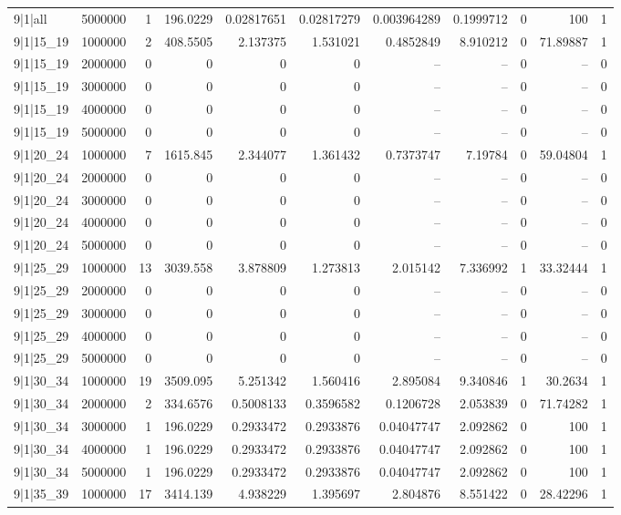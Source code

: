 \begin{tabular}{lrrrrrrrrrr}
9|1|all & 5000000 & 1 & 196.0229 & 0.02817651 & 0.02817279 & 0.003964289 & 0.1999712 & 0 & 100 & 1 \\
9|1|15\_19 & 1000000 & 2 & 408.5505 & 2.137375 & 1.531021 & 0.4852849 & 8.910212 & 0 & 71.89887 & 1 \\
9|1|15\_19 & 2000000 & 0 & 0 & 0 & 0 & -- & -- & 0 & -- & 0 \\
9|1|15\_19 & 3000000 & 0 & 0 & 0 & 0 & -- & -- & 0 & -- & 0 \\
9|1|15\_19 & 4000000 & 0 & 0 & 0 & 0 & -- & -- & 0 & -- & 0 \\
9|1|15\_19 & 5000000 & 0 & 0 & 0 & 0 & -- & -- & 0 & -- & 0 \\
9|1|20\_24 & 1000000 & 7 & 1615.845 & 2.344077 & 1.361432 & 0.7373747 & 7.19784 & 0 & 59.04804 & 1 \\
9|1|20\_24 & 2000000 & 0 & 0 & 0 & 0 & -- & -- & 0 & -- & 0 \\
9|1|20\_24 & 3000000 & 0 & 0 & 0 & 0 & -- & -- & 0 & -- & 0 \\
9|1|20\_24 & 4000000 & 0 & 0 & 0 & 0 & -- & -- & 0 & -- & 0 \\
9|1|20\_24 & 5000000 & 0 & 0 & 0 & 0 & -- & -- & 0 & -- & 0 \\
9|1|25\_29 & 1000000 & 13 & 3039.558 & 3.878809 & 1.273813 & 2.015142 & 7.336992 & 1 & 33.32444 & 1 \\
9|1|25\_29 & 2000000 & 0 & 0 & 0 & 0 & -- & -- & 0 & -- & 0 \\
9|1|25\_29 & 3000000 & 0 & 0 & 0 & 0 & -- & -- & 0 & -- & 0 \\
9|1|25\_29 & 4000000 & 0 & 0 & 0 & 0 & -- & -- & 0 & -- & 0 \\
9|1|25\_29 & 5000000 & 0 & 0 & 0 & 0 & -- & -- & 0 & -- & 0 \\
9|1|30\_34 & 1000000 & 19 & 3509.095 & 5.251342 & 1.560416 & 2.895084 & 9.340846 & 1 & 30.2634 & 1 \\
9|1|30\_34 & 2000000 & 2 & 334.6576 & 0.5008133 & 0.3596582 & 0.1206728 & 2.053839 & 0 & 71.74282 & 1 \\
9|1|30\_34 & 3000000 & 1 & 196.0229 & 0.2933472 & 0.2933876 & 0.04047747 & 2.092862 & 0 & 100 & 1 \\
9|1|30\_34 & 4000000 & 1 & 196.0229 & 0.2933472 & 0.2933876 & 0.04047747 & 2.092862 & 0 & 100 & 1 \\
9|1|30\_34 & 5000000 & 1 & 196.0229 & 0.2933472 & 0.2933876 & 0.04047747 & 2.092862 & 0 & 100 & 1 \\
9|1|35\_39 & 1000000 & 17 & 3414.139 & 4.938229 & 1.395697 & 2.804876 & 8.551422 & 0 & 28.42296 & 1 \\

\end{tabular}
